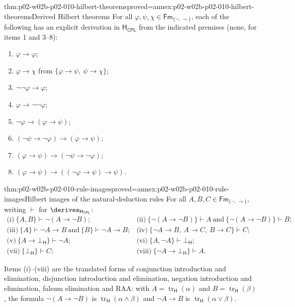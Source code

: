 \begin{hblemma}{thm:p02-w02b-p02-010-hilbert-theorems}{proved=annex:p02-w02b-p02-010-hilbert-theorems}{Derived Hilbert theorems}
For all \(\varphi,\psi,\chi\in\mathsf{Fm}_{\{\neg,\to\}}\), each of the
following has an explicit derivation in \(\mathsf H_{\mathsf{CPL}}\) from the
indicated premises (none, for items 1 and 3--8):
\begin{enumerate}
  \item \(\varphi\to\varphi\);
  \item \(\varphi\to\chi\) from \(\{\varphi\to\psi,\ \psi\to\chi\}\);
  \item \(\neg\neg\varphi\to\varphi\);
  \item \(\varphi\to\neg\neg\varphi\);
  \item \(\neg\varphi\to(\varphi\to\psi)\);
  \item \((\neg\psi\to\neg\varphi)\to(\varphi\to\psi)\);
  \item \((\varphi\to\psi)\to(\neg\psi\to\neg\varphi)\);
  \item \((\varphi\to\psi)\to((\neg\varphi\to\psi)\to\psi)\).
\end{enumerate}
\end{hblemma}

\begin{hblemma}{thm:p02-w02b-p02-010-rule-images}{proved=annex:p02-w02b-p02-010-rule-images}{Hilbert images of the natural-deduction rules}
For all \(A,B,C\in\mathsf{Fm}_{\{\neg,\to\}}\), writing \(\vdash\) for
\(\derives_{\mathsf H_{\mathsf{CPL}}}\):
\[
\begin{array}{ll}
 \text{(i)}\ \{A,B\}\vdash\neg(A\to\neg B);
 &\text{(ii)}\ \{\neg(A\to\neg B)\}\vdash A\ \text{and}\
   \{\neg(A\to\neg B)\}\vdash B;\\[2pt]
 \text{(iii)}\ \{A\}\vdash\neg A\to B\ \text{and}\ \{B\}\vdash\neg A\to B;
 &\text{(iv)}\ \{\neg A\to B,\ A\to C,\ B\to C\}\vdash C;\\[2pt]
 \text{(v)}\ \{A\to\bot_{\mathsf H}\}\vdash\neg A;
 &\text{(vi)}\ \{A,\neg A\}\vdash\bot_{\mathsf H};\\[2pt]
 \text{(vii)}\ \{\bot_{\mathsf H}\}\vdash C;
 &\text{(viii)}\ \{\neg A\to\bot_{\mathsf H}\}\vdash A.
\end{array}
\]
\end{hblemma}

Items (i)--(viii) are the translated forms of conjunction introduction and
elimination, disjunction introduction and elimination, negation
introduction and elimination, falsum elimination and RAA: with
\(A=\operatorname{tr}_{\mathsf H}(\alpha)\) and
\(B=\operatorname{tr}_{\mathsf H}(\beta)\), the formula
\(\neg(A\to\neg B)\) is \(\operatorname{tr}_{\mathsf H}(\alpha\land\beta)\)
and \(\neg A\to B\) is \(\operatorname{tr}_{\mathsf H}(\alpha\lor\beta)\).

